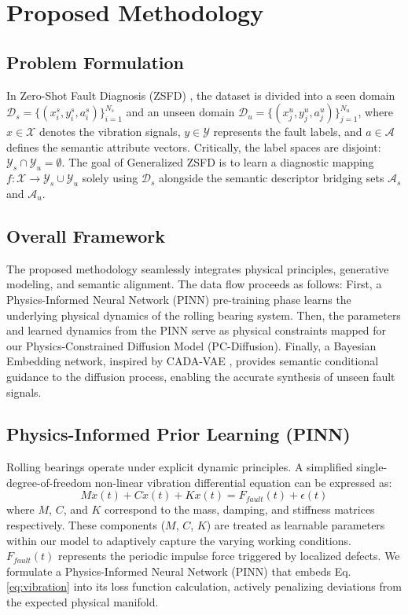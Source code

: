 \section{Proposed Methodology}
\label{sec:method}

\subsection{Problem Formulation}
In Zero-Shot Fault Diagnosis (ZSFD) \cite{zhang2023zero}, the dataset is divided into a seen domain $\mathcal{D}_s = \{(x_i^s, y_i^s, a_i^s)\}_{i=1}^{N_s}$ and an unseen domain $\mathcal{D}_u = \{(x_j^u, y_j^u, a_j^u)\}_{j=1}^{N_u}$, where $x \in \mathcal{X}$ denotes the vibration signals, $y \in \mathcal{Y}$ represents the fault labels, and $a \in \mathcal{A}$ defines the semantic attribute vectors. Critically, the label spaces are disjoint: $\mathcal{Y}_s \cap \mathcal{Y}_u = \emptyset$. The goal of Generalized ZSFD is to learn a diagnostic mapping $f: \mathcal{X} \rightarrow \mathcal{Y}_s \cup \mathcal{Y}_u$ solely using $\mathcal{D}_s$ alongside the semantic descriptor bridging sets $\mathcal{A}_s$ and $\mathcal{A}_u$.

\subsection{Overall Framework}
The proposed methodology seamlessly integrates physical principles, generative modeling, and semantic alignment. The data flow proceeds as follows: First, a Physics-Informed Neural Network (PINN) pre-training phase learns the underlying physical dynamics of the rolling bearing system. Then, the parameters and learned dynamics from the PINN serve as physical constraints mapped for our Physics-Constrained Diffusion Model (PC-Diffusion). Finally, a Bayesian Embedding network, inspired by CADA-VAE \cite{schonfeld2019cada}, provides semantic conditional guidance to the diffusion process, enabling the accurate synthesis of unseen fault signals.

\subsection{Physics-Informed Prior Learning (PINN)}
Rolling bearings operate under explicit dynamic principles. A simplified single-degree-of-freedom non-linear vibration differential equation can be expressed as:
\begin{equation}
    M \ddot{x}(t) + C \dot{x}(t) + K x(t) = F_{fault}(t) + \epsilon(t)
    \label{eq:vibration}
\end{equation}
where $M$, $C$, and $K$ correspond to the mass, damping, and stiffness matrices respectively. These components ($M$, $C$, $K$) are treated as learnable parameters within our model to adaptively capture the varying working conditions. $F_{fault}(t)$ represents the periodic impulse force triggered by localized defects. We formulate a Physics-Informed Neural Network (PINN) \cite{raissi2019physics} that embeds Eq. \ref{eq:vibration} into its loss function calculation, actively penalizing deviations from the expected physical manifold.

